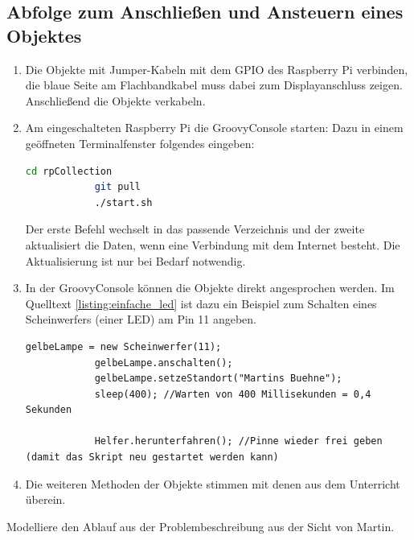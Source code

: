 \documentclass[11pt, a4paper]{scrartcl}
\begin{document}
\subsection*{Abfolge zum Anschließen und Ansteuern eines Objektes}

\begin{enumerate}

	\item Die Objekte mit Jumper-Kabeln mit dem GPIO des Raspberry Pi verbinden, die blaue Seite am Flachbandkabel muss dabei zum Displayanschluss zeigen. Anschließend die Objekte verkabeln.

	\item Am eingeschalteten Raspberry Pi die GroovyConsole starten: Dazu in einem geöffneten Terminalfenster folgendes eingeben:
		\begin{lstlisting}[gobble=6,language=Bash]
			cd rpCollection
			git pull
			./start.sh
		\end{lstlisting}

	Der erste Befehl wechselt in das passende Verzeichnis und der zweite aktualisiert die Daten, wenn eine Verbindung mit dem Internet besteht. Die Aktualisierung ist nur bei Bedarf notwendig.

	\item In der GroovyConsole können die Objekte direkt angesprochen werden. Im Quelltext \ref{listing:einfache_led} ist dazu ein Beispiel zum Schalten eines Scheinwerfers (einer LED) am Pin 11 angeben. 

		\begin{lstlisting}[caption={Steuerung eines Scheinwerfers.},label={listing:einfache_led}, gobble=6]
			gelbeLampe = new Scheinwerfer(11);
			gelbeLampe.anschalten();
			gelbeLampe.setzeStandort("Martins Buehne");
			sleep(400); //Warten von 400 Millisekunden = 0,4 Sekunden
			
			Helfer.herunterfahren(); //Pinne wieder frei geben (damit das Skript neu gestartet werden kann)
		\end{lstlisting}

	\item Die weiteren Methoden der Objekte stimmen mit denen aus dem Unterricht überein.

\end{enumerate}

\begin{aufgabe}
	Modelliere den Ablauf aus der Problembeschreibung aus der Sicht von Martin.
\end{aufgabe}
\end{document}
